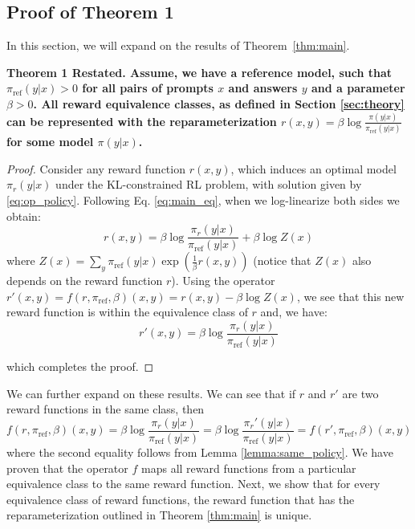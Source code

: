 \documentclass{article}
\begin{document}
\subsection{Proof of Theorem 1}
\label{app:thm1}

In this section, we will expand on the results of Theorem~\ref{thm:main}.

\begin{em}
\bf Theorem 1 Restated.
    Assume, we have a reference model, such that $\pi_\text{ref}(y|x)>0$ for all pairs of prompts $x$ and answers $y$ and a parameter $\beta>0$. All reward equivalence classes, as defined in Section \ref{sec:theory} can be represented with the reparameterization $r(x, y) = \beta \log \frac{\pi(y|x)}{\pi_\text{ref}(y|x)}$ for some model $\pi(y|x)$.
\end{em}
\begin{proof}
Consider any reward function $r(x,y)$, which induces an optimal model $\pi_r(y|x)$ under the KL-constrained RL problem, with solution given by \ref{eq:op_policy}. Following Eq. \ref{eq:main_eq}, when we log-linearize both sides we obtain:
\begin{equation*}
    r(x,y) =\beta \log \frac{\pi_r(y|x)}{\pi_\text{ref}(y|x)} + \beta \log Z(x)
\end{equation*}
where $Z(x) =\sum_{y}\pi_\text{ref}(y|x)\exp\left(\frac{1}{\beta}r(x, y)\right)$ (notice that $Z(x)$ also depends on the reward function $r$). Using the operator $r'(x, y) = f(r, \pi_\text{ref}, \beta)(x, y) = r(x, y) - \beta \log Z(x)$, we see that this new reward function is within the equivalence class of $r$ and, we have:
\begin{equation*}
    r'(x,y) =\beta \log \frac{\pi_r(y|x)}{\pi_\text{ref}(y|x)}
\end{equation*}

which completes the proof.
\end{proof}
We can further expand on these results. We can see that if $r$ and $r'$ are two reward functions in the same class, then
\begin{equation*}
    f(r, \pi_\text{ref}, \beta)(x, y)= \beta \log \frac{\pi_r(y|x)}{\pi_\text{ref}(y|x)}=
\beta \log \frac{\pi_r'(y|x)}{\pi_\text{ref}(y|x)} = f(r', \pi_\text{ref}, \beta)(x, y)
\end{equation*}
where the second equality follows from Lemma \ref{lemma:same_policy}. We have proven that the operator $f$ maps all reward functions from a particular equivalence class to the same reward function. Next, we show that for every equivalence class of reward functions, the reward function that has the reparameterization outlined in Theorem \ref{thm:main} is unique.
\end{document}
